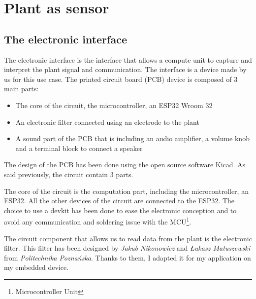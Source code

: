 \section{Plant as sensor}

\subsection{The electronic interface}

The electronic interface is the interface that allows a compute unit to capture and interpret the plant signal and
communication. The interface is a device made by us for this use case. The printed circuit board (PCB)
device is composed of 3 main parts:
\begin{itemize}
    \item The core of the circuit, the microcontroller, an ESP32 Wroom 32
    \item An electronic filter connected using an electrode to the plant
    \item A sound part of the PCB that is including an audio amplifier, a volume knob and a terminal block to connect a speaker
\end{itemize}

The design of the PCB has been done using the open source software Kicad.
As said previously, the circuit contain 3 parts.

The core of the circuit is the computation part, including the microcontroller, an ESP32. All the other
devices of the circuit are connected to the ESP32. The choice to use a devkit has been done 
to ease the electronic conception and to avoid any communication and soldering issue with the MCU\footnote[1]{Microcontroller Unit}.


The circuit component that allows us to read data from the plant is the electronic filter.
This filter has been designed by \textit{Jakub Nikonowicz} and \textit{Łukasz Matuszewski} 
from \textit{Politechnika Poznańska}.
Thanks to them, I adapted it for my application on my embedded device. 


